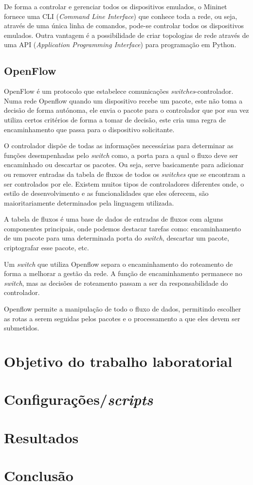 De forma a controlar e gerenciar todos os dispositivos emulados, o Mininet fornece uma CLI (\textit{Command Line Interface}) que conhece toda a rede, ou seja, através de uma única linha de comandos, pode-se controlar todos os dispositivos emulados. Outra vantagem é a possibilidade de criar topologias de rede através de uma API (\textit{Application Programming Interface}) para programação em Python.

\subsection{OpenFlow} \label{openflow}

OpenFlow é um protocolo que estabelece comunicações \textit{switches}-controlador.
Numa rede Openflow quando um dispositivo recebe um pacote, este não toma a decisão de forma autónoma, ele envia o pacote para o controlador que por sua vez utiliza certos critérios de forma a tomar de decisão, este cria uma regra de encaminhamento que passa para o dispositivo solicitante.

O controlador dispõe de todas as informações necessárias para determinar as funções desempenhadas pelo \textit{switch} como, a porta para a qual o fluxo deve ser encaminhado ou descartar os pacotes.
Ou seja, serve basicamente para adicionar ou remover entradas da tabela de fluxos de todos os \textit{switches} que se encontram a ser controlados por ele.
Existem muitos tipos de controladores diferentes onde, o estilo de desenvolvimento e as funcionalidades que eles oferecem, são maioritariamente determinados pela linguagem utilizada.

A tabela de fluxos é uma base de dados de entradas de fluxos com alguns componentes principais, onde podemos destacar tarefas como: encaminhamento de um pacote para uma determinada porta do \textit{switch}, descartar um pacote, criptografar esse pacote, etc.

Um \textit{switch} que utiliza Openflow separa o encaminhamento do roteamento de forma a melhorar a gestão da rede.
A função de encaminhamento permanece no \textit{switch}, mas as decisões de roteamento passam a ser da responsabilidade do controlador.

Openflow permite a manipulação de todo o fluxo de dados, permitindo escolher as rotas a serem seguidas pelos pacotes e o processamento a que eles devem ser submetidos.



\section*{Objetivo do trabalho laboratorial}


\section*{Configurações/\textit{scripts}}


\section*{Resultados}


\section*{Conclusão}